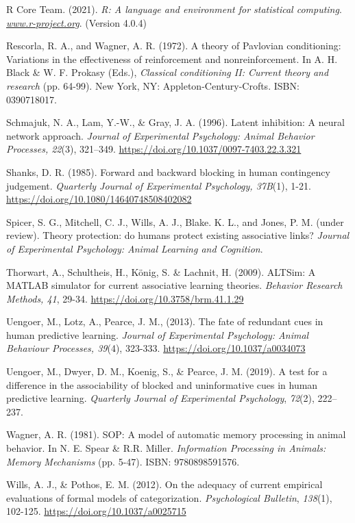\documentclass[twocolumn]{article}
\begin{document}
\begin{hangparas}{1em}{1}
R Core Team. (2021). \emph{R: A language and environment for statistical
computing}. \href{http://www.r-project.org/}{\emph{www.r-project.org}}.
(Version 4.0.4)

Rescorla, R. A., and Wagner, A. R. (1972). A theory of Pavlovian
conditioning: Variations in the effectiveness of reinforcement and
nonreinforcement. In A. H. Black \& W. F. Prokasy (Eds.),
\emph{Classical conditioning II: Current theory and research }(pp.
64-99). New York, NY: Appleton-Century-Crofts.  ISBN: 0390718017.

Schmajuk, N. A., Lam, Y.-W., \& Gray, J. A. (1996). Latent inhibition: A
neural network approach. \emph{Journal of Experimental Psychology:
Animal Behavior Processes, 22}(3), 321--349.
\href{https://psycnet.apa.org/doi/10.1037/0097-7403.22.3.321}{https://doi.org/10.1037/0097-7403.22.3.321}

Shanks, D. R. (1985). Forward and backward blocking in human contingency
judgement. \emph{Quarterly Journal of Experimental Psychology, 37B}(1), 1-21.
\url{https://doi.org/10.1080/14640748508402082}

Spicer, S. G., Mitchell, C. J., Wills, A. J., Blake. K. L., and Jones,
P. M. (under review). Theory protection: do humans protect existing
associative links? \emph{Journal of Experimental Psychology: Animal
Learning and Cognition}.

Thorwart, A., Schultheis, H., König, S. \& Lachnit, H. (2009). ALTSim: A
MATLAB simulator for current associative learning theories.
\emph{Behavior Research Methods, 41}, 29-34.
\url{https://doi.org/10.3758/brm.41.1.29}

Uengoer, M., Lotz, A., Pearce, J. M., (2013). The fate of redundant cues
in human predictive learning. \emph{Journal of Experimental Psychology:
Animal Behaviour Processes, 39}(4), 323-333.
\url{https://doi.org/10.1037/a0034073}

Uengoer, M., Dwyer, D. M., Koenig, S., \& Pearce, J. M. (2019). A test
for a difference in the associability of blocked and uninformative cues
in human predictive learning. \emph{Quarterly Journal of Experimental
Psychology}, \emph{72}(2), 222--237.

Wagner, A. R. (1981). SOP: A model of automatic memory processing in
animal behavior. In N. E. Spear \& R.R. Miller. \emph{Information Processing in Animals: Memory
Mechanisms} (pp. 5-47). ISBN: 9780898591576.

Wills, A. J., \& Pothos, E. M. (2012). On the adequacy of current
empirical evaluations of formal models of categorization.
\emph{Psychological Bulletin}, \emph{138}(1), 102-125.
\url{https://doi.org/10.1037/a0025715}


\end{hangparas}
\end{document}
